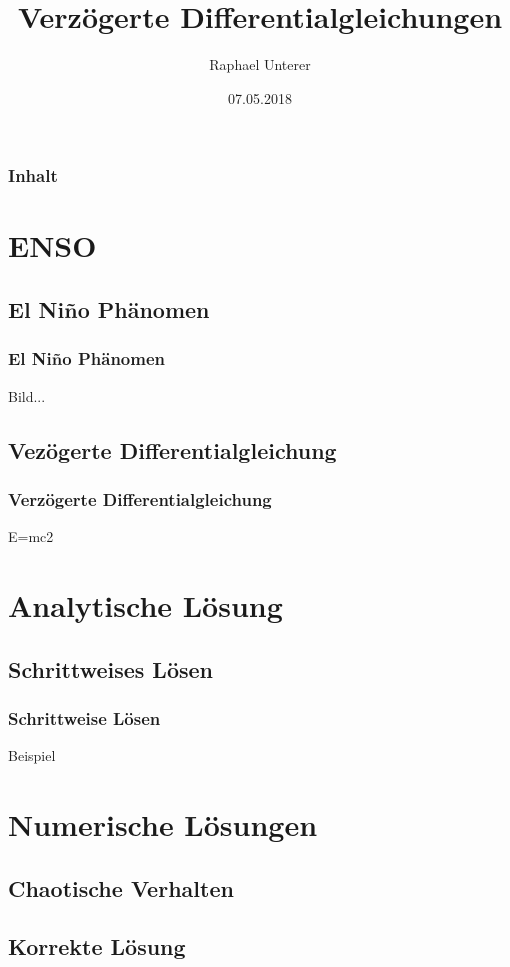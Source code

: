 \documentclass{beamer}
\title{Verzögerte Differentialgleichungen}
\author{Raphael Unterer}
\institute{Mathematisches Seminar 2018}
\date{07.05.2018}
\begin{document}
\begin{frame}
\titlepage
\end{frame}

\begin{frame}
\frametitle{Inhalt}
\tableofcontents
\end{frame}

\section{ENSO}

\subsection{El Niño Phänomen}
\begin{frame}
	\frametitle{El Niño Phänomen}
	Bild...
\end{frame}

\subsection{Vezögerte Differentialgleichung} 
\begin{frame}
	\frametitle{Verzögerte Differentialgleichung}
	E=mc2
\end{frame}

\section{Analytische Lösung}

\subsection{Schrittweises Lösen}
\begin{frame}
	\frametitle{Schrittweise Lösen}
	Beispiel
\end{frame}

\section{Numerische Lösungen}

\subsection{Chaotische Verhalten}
\subsection{Korrekte Lösung}
\end{document}
